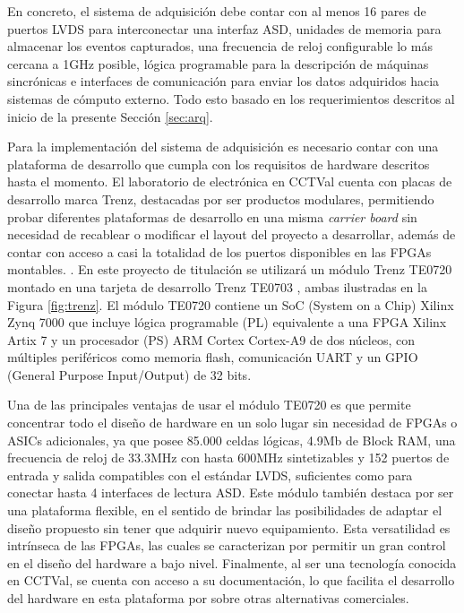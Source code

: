 		En concreto, el sistema de adquisición debe contar con al menos 16 pares de puertos LVDS para interconectar una interfaz ASD, unidades de memoria para almacenar los eventos capturados, una frecuencia de reloj configurable lo más cercana a 1GHz posible, lógica programable para la descripción de máquinas sincrónicas e interfaces de comunicación para enviar los datos adquiridos hacia sistemas de cómputo externo. Todo esto basado en los requerimientos descritos al inicio de la presente Sección \ref{sec:arq}.
		
		Para la implementación del sistema de adquisición es necesario contar con una plataforma de desarrollo que cumpla con los requisitos de hardware descritos hasta el momento. El laboratorio de electrónica en CCTVal cuenta con placas de desarrollo marca Trenz, destacadas por ser productos modulares, permitiendo probar diferentes plataformas de desarrollo en una misma \textit{carrier board} sin necesidad de recablear o modificar el layout del proyecto a desarrollar, además de contar con acceso a casi la totalidad de los puertos disponibles en las FPGAs montables. . En este proyecto de titulación se utilizará un módulo Trenz TE0720 \cite{TrenzElectronic2020TE0720Wiki} montado en una tarjeta de desarrollo Trenz TE0703 \cite{TrenzElectronic2019TE0703Wiki}, ambas ilustradas en la Figura \ref{fig:trenz}. El módulo TE0720 contiene un SoC (System on a Chip) Xilinx Zynq 7000 \cite{Xilinx2012Zynq-7000Architecture} que incluye lógica programable (PL) equivalente a una FPGA Xilinx Artix 7\cite{Xilinx20107DS180} y un procesador (PS) ARM Cortex Cortex-A9 de dos núcleos, con múltiples periféricos como memoria flash, comunicación UART y un GPIO (General Purpose Input/Output) de 32 bits.
		
		Una de las principales ventajas de usar el módulo TE0720 es que permite concentrar todo el diseño de hardware en un solo lugar sin necesidad de FPGAs o ASICs adicionales, ya que posee 85.000 celdas lógicas, 4.9Mb de Block RAM, una frecuencia de reloj de 33.3MHz con hasta 600MHz sintetizables y 152 puertos de entrada y salida compatibles con el estándar LVDS, suficientes como para conectar hasta 4 interfaces de lectura ASD. Este módulo también destaca por ser una plataforma flexible, en el sentido de brindar las posibilidades de adaptar el diseño propuesto sin tener que adquirir nuevo equipamiento. Esta versatilidad es intrínseca de las FPGAs, las cuales se caracterizan por permitir un gran control en el diseño del hardware a bajo nivel. Finalmente, al ser una tecnología conocida en CCTVal, se cuenta con acceso a su documentación, lo que facilita el desarrollo del hardware en esta plataforma por sobre otras alternativas comerciales.
		
